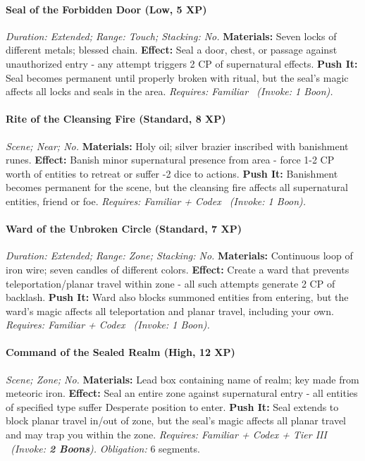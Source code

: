 \paragraph{Seal of the Forbidden Door (Low, 5 XP)} \emph{Duration: Extended; Range: Touch; Stacking: No.}
\textbf{Materials:} Seven locks of different metals; blessed chain.
\textbf{Effect:} Seal a door, chest, or passage against unauthorized entry - any attempt triggers 2 CP of supernatural effects.
\textbf{Push It:} Seal becomes permanent until properly broken with ritual, but the seal's magic affects all locks and seals in the area.
\emph{Requires: Familiar \ (\textit{Invoke:} 1 Boon).}
\paragraph{Rite of the Cleansing Fire (Standard, 8 XP)} \emph{Scene; Near; No.}
\textbf{Materials:} Holy oil; silver brazier inscribed with banishment runes.
\textbf{Effect:} Banish minor supernatural presence from area - force 1-2 CP worth of entities to retreat or suffer -2 dice to actions.
\textbf{Push It:} Banishment becomes permanent for the scene, but the cleansing fire affects all supernatural entities, friend or foe.
\emph{Requires: Familiar + Codex \ (\textit{Invoke:} 1 Boon).}
\paragraph{Ward of the Unbroken Circle (Standard, 7 XP)} \emph{Duration: Extended; Range: Zone; Stacking: No.}
\textbf{Materials:} Continuous loop of iron wire; seven candles of different colors.
\textbf{Effect:} Create a ward that prevents teleportation/planar travel within zone - all such attempts generate 2 CP of backlash.
\textbf{Push It:} Ward also blocks summoned entities from entering, but the ward's magic affects all teleportation and planar travel, including your own.
\emph{Requires: Familiar + Codex \ (\textit{Invoke:} 1 Boon).}
\paragraph{Command of the Sealed Realm (High, 12 XP)} \emph{Scene; Zone; No.}
\textbf{Materials:} Lead box containing name of realm; key made from meteoric iron.
\textbf{Effect:} Seal an entire zone against supernatural entry - all entities of specified type suffer Desperate position to enter.
\textbf{Push It:} Seal extends to block planar travel in/out of zone, but the seal's magic affects all planar travel and may trap you within the zone.
\emph{Requires: Familiar + Codex + Tier III \ (\textit{Invoke:} \textbf{2 Boons}).}
\emph{Obligation:} 6 segments.

